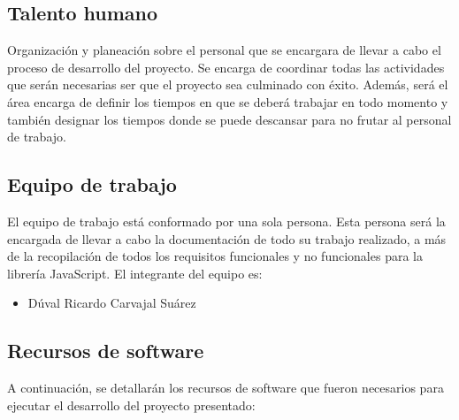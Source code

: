 \subsection{Talento humano}

Organización y planeación sobre el personal que se encargara de llevar a cabo el proceso de desarrollo del proyecto. Se encarga de coordinar todas las actividades que serán necesarias ser que el proyecto sea culminado con éxito. Además, será el área encarga de definir los tiempos en que se deberá trabajar en todo momento y también designar los tiempos donde se puede descansar para no frutar al personal de trabajo.

\subsection{Equipo de trabajo}

El equipo de trabajo está conformado por una sola persona. Esta persona será la encargada de llevar a cabo la documentación de todo su trabajo realizado, a más de la recopilación de todos los requisitos funcionales y no funcionales para la librería JavaScript. El integrante del equipo es:

\begin{itemize}
	\item Dúval Ricardo Carvajal Suárez
\end{itemize} 

\subsection{Recursos de software}

A continuación, se detallarán los recursos de software que fueron necesarios para ejecutar el desarrollo del proyecto presentado:

